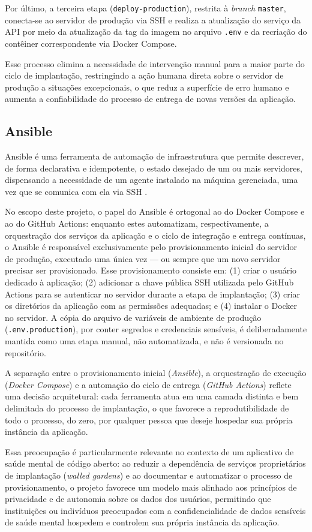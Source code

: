 Por último, a terceira etapa (\texttt{deploy-production}), restrita à
\textit{branch} \texttt{master}, conecta-se ao servidor de produção via SSH e
realiza a atualização do serviço da API por meio da atualização da tag da
imagem no arquivo \texttt{.env} e da recriação do contêiner correspondente
via Docker Compose.

Esse processo elimina a necessidade de intervenção manual para a maior
parte do ciclo de implantação, restringindo a ação humana direta sobre o
servidor de produção a situações excepcionais, o que reduz a superfície de
erro humano e aumenta a confiabilidade do processo de entrega de novas
versões da aplicação.

\subsection{Ansible}

Ansible é uma ferramenta de automação de infraestrutura que permite
descrever, de forma declarativa e idempotente, o estado desejado de um ou
mais servidores, dispensando a necessidade de um agente instalado na máquina
gerenciada, uma vez que se comunica com ela via SSH \citep{ansible:2026}.

No escopo deste projeto, o papel do Ansible é ortogonal ao do Docker Compose
e ao do GitHub Actions: enquanto estes automatizam, respectivamente, a
orquestração dos serviços da aplicação e o ciclo de integração e entrega
contínuas, o Ansible é responsável exclusivamente pelo provisionamento
inicial do servidor de produção, executado uma única vez --- ou sempre que um
novo servidor precisar ser provisionado. Esse provisionamento consiste em:
(1) criar o usuário dedicado à aplicação; (2) adicionar a chave pública SSH
utilizada pelo GitHub Actions para se autenticar no servidor durante a etapa
de implantação; (3) criar os diretórios da aplicação com as permissões
adequadas; e (4) instalar o Docker no servidor. A cópia do arquivo de
variáveis de ambiente de produção (\texttt{.env.production}), por conter
segredos e credenciais sensíveis, é deliberadamente mantida como uma etapa
manual, não automatizada, e não é versionada no repositório.

A separação entre o provisionamento inicial (\textit{Ansible}), a orquestração de
execução (\textit{Docker Compose}) e a automação do ciclo de
entrega (\textit{GitHub Actions}) reflete uma decisão arquitetural:
cada ferramenta atua em uma camada distinta e bem delimitada do processo
de implantação, o que favorece a reprodutibilidade de todo o processo,
do zero, por qualquer pessoa que deseje hospedar sua própria instância da aplicação.

Essa preocupação é particularmente relevante no contexto de um
aplicativo de saúde mental de código aberto: ao reduzir a dependência
de serviços proprietários de implantação (\textit{walled gardens}) e
ao documentar e automatizar o processo de provisionamento, o projeto
favorece um modelo mais alinhado aos princípios de privacidade e de
autonomia sobre os dados dos usuários, permitindo que instituições ou
indivíduos preocupados com a confidencialidade de dados sensíveis de
saúde mental hospedem e controlem sua própria instância da aplicação.
